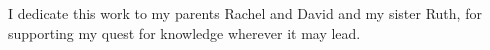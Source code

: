 \thispagestyle{empty}
{}

\vspace*{3cm}


\medskip

\begin{center}
    I dedicate this work to my parents Rachel and David and my sister Ruth, for supporting my quest for knowledge wherever it may lead. \\ \smallskip
\end{center}
